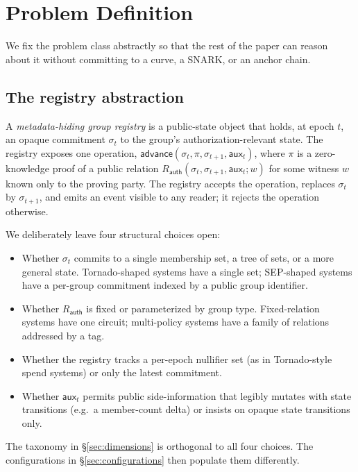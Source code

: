 \section{Problem Definition}
\label{sec:problem}

We fix the problem class abstractly so that the rest of the paper can
reason about it without committing to a curve, a SNARK, or an anchor
chain.

\subsection{The registry abstraction}

A \emph{metadata-hiding group registry} is a public-state object that
holds, at epoch $t$, an opaque commitment $\sigma_t$ to the group's
authorization-relevant state. The registry exposes one operation,
$\mathsf{advance}(\sigma_t, \pi, \sigma_{t+1}, \mathsf{aux}_t)$, where
$\pi$ is a zero-knowledge proof of a public relation
$R_{\mathsf{auth}}(\sigma_t, \sigma_{t+1}, \mathsf{aux}_t; w)$ for some
witness $w$ known only to the proving party. The registry accepts the
operation, replaces $\sigma_t$ by $\sigma_{t+1}$, and emits an event
visible to any reader; it rejects the operation otherwise.

We deliberately leave four structural choices open:
\begin{itemize}
  \item Whether $\sigma_t$ commits to a single membership set, a tree
    of sets, or a more general state. Tornado-shaped systems have a
    single set; SEP-shaped systems have a per-group commitment indexed
    by a public group identifier.
  \item Whether $R_{\mathsf{auth}}$ is fixed or parameterized by group
    type. Fixed-relation systems have one circuit; multi-policy
    systems have a family of relations addressed by a tag.
  \item Whether the registry tracks a per-epoch nullifier set (as in
    Tornado-style spend systems) or only the latest commitment.
  \item Whether $\mathsf{aux}_t$ permits public side-information that
    legibly mutates with state transitions (e.g.\ a member-count
    delta) or insists on opaque state transitions only.
\end{itemize}

The taxonomy in \S\ref{sec:dimensions} is orthogonal to all four
choices. The configurations in \S\ref{sec:configurations} then
populate them differently.

